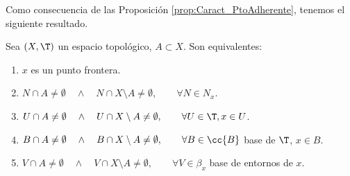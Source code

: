 Como consecuencia de las Proposición \ref{prop:Caract_PtoAdherente}, tenemos el siguiente resultado.
\begin{prop}\label{prop:Caract_PtoFrontera}
Sea $(X,\T)$ un espacio topológico, $A\subset X$. Son equivalentes:
    \begin{enumerate}
        \item $x$ es un punto frontera.
        \item $N\cap A\neq \emptyset \quad \land \quad N\cap X\setminus A\neq \emptyset,\qquad \forall N\in N_x$.
        \item $U\cap A\neq \emptyset \quad \land \quad U\cap X\setminus A\neq \emptyset,\qquad \forall U\in \T, x\in U$.
        \item $B\cap A\neq \emptyset \quad \land \quad B\cap X\setminus A\neq \emptyset,\qquad \forall B\in \cc{B}$ base de $\T$, $x\in B$.
        \item $V\cap A\neq \emptyset \quad \land \quad V\cap X\setminus A\neq \emptyset,\qquad \forall V\in \beta_x$ base de entornos de $x$.
    \end{enumerate}
\end{prop}\vspace{1em}



